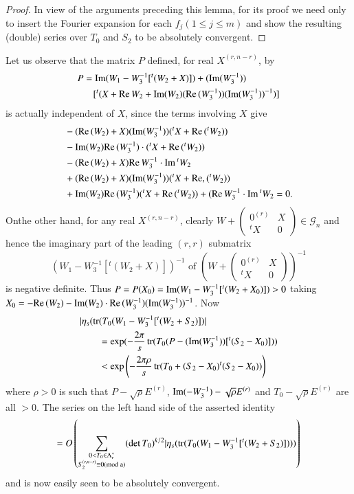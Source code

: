 \begin{proof}
In view of the arguments preceding this lemma, for its proof we need
only to insert the Fourier expansion for each $f_{j}(1\leq j\leq m)$
and show the resulting (double) series over $T_{0}$ and $S_{2}$ to be
absolutely convergent.
\end{proof}

Let us observe that the matrix $P$ defined, for real $X^{(r,n-r)}$, by 
\begin{align*}
P&=\operatorname{Im}(W_{1}-W^{-1}_{3}[{}^{t}(W_{2}+X)])+(\operatorname{Im}(W^{-1}_{3}))\\
&\quad[{}^{t}(X+\text{Re\,}W_{2}+\operatorname{Im}(W_{2})(\text{Re\,}(W^{-1}_{3}))(\operatorname{Im}(W^{-1}_{3}))^{-1})] 
\end{align*}
is actually independent of $X$, since the terms involving $X$ give 
\begin{align*}
&-(\text{Re\,}(W_{2})+X)(\operatorname{Im}(W^{-1}_{3}))({}^{t}X+\text{Re\,}({}^{t}W_{2}))\\
&-\operatorname{Im}(W_{2})\text{Re\,}(W^{-1}_{3})\cdot({}^{t}X+\text{Re\,}({}^{t}W_{2}))\\
& -(\text{Re\,}(W_{2})+X)\text{Re\,}W^{-1}_{3}\cdot
  \operatorname{Im}{}^{t}W_{2}\\
&+(\text{Re\,}(W_{2})+X)(\operatorname{Im}(W^{-1}_{3}))({}^{t}X+\text{Re,\,}({}^{t}W_{2}))\\
& +\operatorname{Im}(W_{2})\text{Re\,}(W^{-1}_{3})({}^{t}X+\text{Re\,}({}^{t}W_{2}))+(\text{Re\,}W^{-1}_{3}\cdot \operatorname{Im}{}^{t}W_{2}=0.
\end{align*}
On\pageoriginale the other hand, for any real $X^{(r,n-r)}$, clearly
$W+\left(\begin{smallmatrix} 0^{(r)} & X\\ {}^{t}X & 0
\end{smallmatrix}\right)\in\mathscr{G}_{n}$ and hence the imaginary
part of the leading $(r,r)$ submatrix 
$$
(W_{1}-W^{-1}_{3}[{}^{t}(W_{2}+X)])^{-1}\text{ \ of \ } (W+
\begin{pmatrix}
0^{(r)} & X\\
{}^{t}X & 0
\end{pmatrix}
)^{-1}
$$
is negative definite. Thus
$P=P(X_{0})=\operatorname{Im}(W_{1}-W^{-1}_{3}[{}^{t}(W_{2}+X_{0})])>0$ taking
$X_{0}=-\text{Re\,}(W_{2})-\operatorname{Im}(W_{2})\cdot
\text{Re\,}(W^{-1}_{3})(\operatorname{Im}(W^{-1}_{3}))^{-1}$. Now
\begin{align*}
&|\eta_{s}(\operatorname{tr}(T_{0}(W_{1}-W^{-1}_{3}[{}^{t}(W_{2}+S_{2})])|\\
&\qquad =\exp(-\frac{2\pi}{s}\operatorname{tr}(T_{0}(P-(\operatorname{Im}(W^{-1}_{3}))[{}^{t}(S_{2}-X_{0})]))\\
&\qquad <\exp\left(-\frac{2\pi\rho}{s}\operatorname{tr}(T_{0}+(S_{2}-X_{0}){}^{t}(S_{2}-X_{0}))\right) 
\end{align*}
where $\rho>0$ is such that $P-\sqrt{\rho}E^{(r)}$,
$\operatorname{Im}(-W^{-1}_{3})-\sqrt{\rho}E^{(r)}$ and $T_{0}-\sqrt{\rho}E^{(r)}$
are all $>0$. The series on the left hand side of the asserted
identity
$$
=O\left(\sum_{\substack{0<T_{0}\in
    \Lambda^{\ast}_{r}\\ S_{2}^{(r,n-r)}\equiv 0(\rm{mod} \; a)}}(\det T_{0})^{k/2}|\eta_{s}(\operatorname{tr}(T_{0}(W_{1}-W^{-1}_{3}[{}^{t}(W_{2}+S_{2})])))\right)
$$
and is now easily seen to be absolutely convergent.

